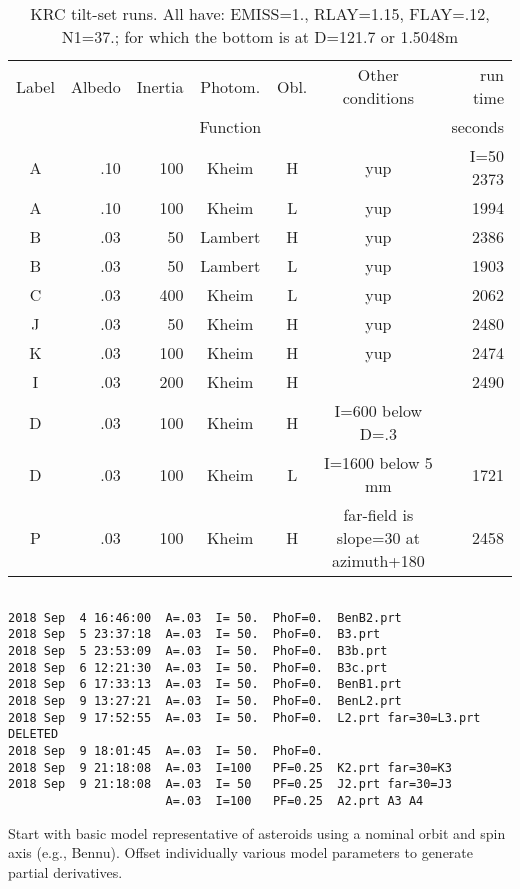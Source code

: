 \documentclass{article}
\begin{document}
\begin{table} [!h]
\caption{KRC tilt-set runs. All have: EMISS=1., RLAY=1.15, FLAY=.12, N1=37.; for which the bottom is at  D=121.7 or 1.5048m }
\label{runt}
\begin{center}
\begin{tabular}{| c  r  r  c c | c | r | } \hline \hline
Label & Albedo & Inertia & Photom. & Obl. & Other conditions & run time\\
       &       &        & Function &  &  & seconds\\  \hline
A & .10 & 100 & Kheim & H & yup & I=50 2373 \\ 
A & .10 & 100 & Kheim & L & yup &  1994 \\ 
B & .03 &  50 & Lambert & H & yup  & 2386 \\   %
B & .03 &  50 & Lambert & L & yup  & 1903 \\   
C & .03 & 400 & Kheim & L & yup & 2062 \\  %
J & .03 &  50 & Kheim & H & yup & 2480 \\ 
K & .03 & 100 & Kheim & H & yup & 2474 \\ 
I & .03 & 200 & Kheim & H & &  2490 \\ 
D & .03 & 100 & Kheim & H & I=600 below D=.3 & \\
D & .03 & 100 & Kheim & L & I=1600 below 5 mm & 1721 \\
P & .03 & 100 & Kheim & H & far-field is slope=30 at azimuth+180 & 2458 \\ 
 \hline
\end{tabular} \end{center}
\end{table}
\vspace{-3.mm} 
\begin{verbatim}

2018 Sep  4 16:46:00  A=.03  I= 50.  PhoF=0.  BenB2.prt
2018 Sep  5 23:37:18  A=.03  I= 50.  PhoF=0.  B3.prt
2018 Sep  5 23:53:09  A=.03  I= 50.  PhoF=0.  B3b.prt
2018 Sep  6 12:21:30  A=.03  I= 50.  PhoF=0.  B3c.prt
2018 Sep  6 17:33:13  A=.03  I= 50.  PhoF=0.  BenB1.prt
2018 Sep  9 13:27:21  A=.03  I= 50.  PhoF=0.  BenL2.prt
2018 Sep  9 17:52:55  A=.03  I= 50.  PhoF=0.  L2.prt far=30=L3.prt DELETED    
2018 Sep  9 18:01:45  A=.03  I= 50.  PhoF=0. 
2018 Sep  9 21:18:08  A=.03  I=100   PF=0.25  K2.prt far=30=K3
2018 Sep  9 21:18:08  A=.03  I= 50   PF=0.25  J2.prt far=30=J3
                      A=.03  I=100   PF=0.25  A2.prt A3 A4
\end{verbatim}
 Start with basic model representative of asteroids using a nominal orbit and
 spin axis (e.g., Bennu). Offset individually various model parameters to
 generate partial derivatives.
\end{document}
